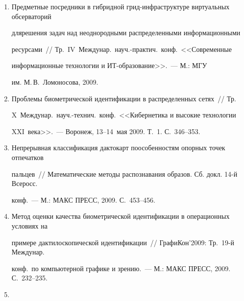 \begin{enumerate}[1.]
\item {}


Предметные посредники в гибридной грид-инфраструктуре виртуальных обсерваторий 


для\linebreak решения задач над неоднородными распределенными информационными 


ресурсами~// Тр.\ IV~Междунар.\ науч.-практич.\ конф.\ <<Современные 


информационные технологии и ИТ-\linebreak обра\-зо\-ва\-ние>>.~--- М.: МГУ


им. М.\,В.~Ломоносова, 2009.





\item {}


Проблемы биометрической идентификации в распределенных сетях~// Тр.\ 


X~Междунар.\ науч.-технич.\ конф.\ <<Кибернетика и высокие технологии 


XXI~ве\-ка>>.~--- Воронеж, 13--14~мая 2009. Т.~1. С.~346--353.





\item {}


Непрерывная классификация дактокарт по\linebreak особенностям опорных точек отпечатков 


пальцев~// Математические методы распознавания образов. Сб. докл. 14-й Всеросс.\ 


конф.~--- М.: МАКС ПРЕСС, 2009.  С.~453--456.





\item {}


Метод оценки качества биометрической идентификации в операционных условиях на 


примере дактилоскопической идентификации~// ГрафиКон'2009: Тр.\ 19-й Междунар.\ 


конф.\ по компьютерной графике и зрению.~--- М.: МАКС ПРЕСС, 2009. С.~232--235.





\item {}



\end{enumerate}
